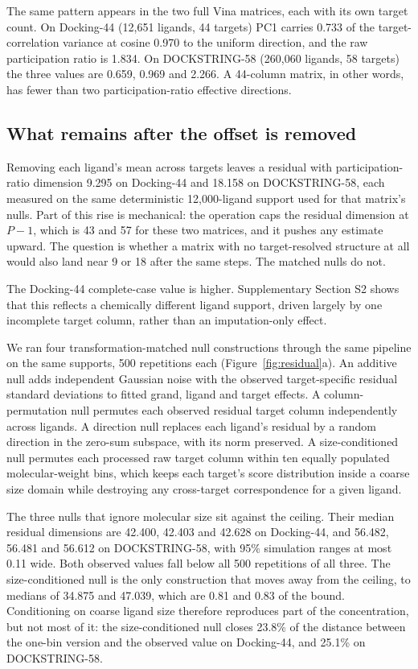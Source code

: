 The same pattern appears in the two full Vina matrices, each with its own target count. On
Docking-44 (12{,}651 ligands, 44 targets) PC1 carries 0.733 of the target-correlation
variance at cosine 0.970 to the uniform direction, and the raw participation ratio is 1.834.
On DOCKSTRING-58 (260{,}060 ligands, 58 targets) the three values are 0.659, 0.969 and 2.266.
A 44-column matrix, in other words, has fewer than two participation-ratio effective directions.

\subsection{What remains after the offset is removed}

Removing each ligand's mean across targets leaves a residual with participation-ratio
dimension 9.295 on Docking-44 and 18.158 on DOCKSTRING-58, each measured on the same
deterministic 12{,}000-ligand support used for that matrix's nulls. Part of this rise is
mechanical: the operation caps the residual dimension at $P-1$, which is 43
and 57 for these two matrices, and it pushes any estimate upward. The question is whether a
matrix with no target-resolved structure at all would also land near 9 or 18 after the same
steps. The matched nulls do not.

The Docking-44 complete-case value is higher. Supplementary Section S2 shows that this reflects
a chemically different ligand support, driven largely by one incomplete target column, rather
than an imputation-only effect.

We ran four transformation-matched null constructions through the same pipeline on the
same supports, 500 repetitions each (Figure~\ref{fig:residual}a). An additive null adds
independent Gaussian noise with the observed target-specific residual standard deviations to
fitted grand, ligand and target effects. A column-permutation null permutes each observed
residual target column independently across ligands. A direction null replaces each ligand's
residual by a random direction in the zero-sum subspace, with its norm preserved. A
size-conditioned null permutes each processed raw target column within ten equally populated
molecular-weight bins, which keeps each target's score distribution inside a coarse size
domain while destroying any cross-target correspondence for a given ligand.

The three nulls that ignore molecular size sit against the ceiling. Their median residual
dimensions are 42.400, 42.403 and 42.628 on Docking-44, and 56.482, 56.481 and 56.612 on
DOCKSTRING-58, with 95\% simulation ranges at most 0.11 wide. Both observed values fall below
all 500 repetitions of all three. The size-conditioned null is the only construction that
moves away from the ceiling, to medians of 34.875 and 47.039, which are 0.81 and 0.83 of the
bound. Conditioning on coarse ligand size therefore reproduces part of the concentration, but not
most of it:
the size-conditioned null closes 23.8\% of the distance between the one-bin version and
the observed value on Docking-44, and 25.1\% on DOCKSTRING-58.

